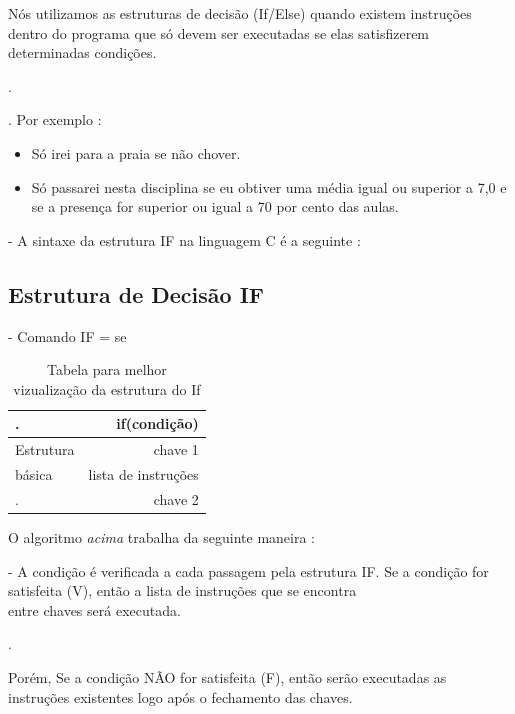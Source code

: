 \documentclass[a4paper,10pt]{article}  %
\begin{document}
    Nós utilizamos as estruturas de decisão (If/Else) quando existem instruções
dentro do programa que só devem ser executadas se elas satisfizerem  
determinadas condições.


  .

  . Por exemplo :

\begin{itemize}
               
       \item  Só irei para a praia se não chover. 
       \item  Só passarei nesta disciplina se eu obtiver uma média igual ou superior a 7,0 e se a presença for superior ou igual a 70 por cento das aulas.
             
\end{itemize}

   - A sintaxe da estrutura IF na linguagem C é a seguinte :
 
 \subsection{Estrutura de Decisão IF}   
       
  -  Comando IF = se
   
\begin{table}[H]
\begin{center}
 \caption{Tabela para melhor vizualização da estrutura do If}
\begin{tabular}{|l|r|}
  \hline \hline
  
  .          & if(condição) \\ \hline
  Estrutura  & chave 1  \\ \hline
    básica   &   lista de instruções  \\ \hline
  .          & chave 2  \\ \hline
  
\end{tabular}
\label{tab:resultados}
\end{center}
\end{table}


  O algoritmo \textit{acima} trabalha da seguinte maneira :
 

  -  A condição é verificada a cada passagem pela estrutura IF. Se a condição for satisfeita (V), então a lista de instruções que se encontra\\ entre chaves será executada.

 .

   Porém, Se a condição NÃO for satisfeita (F), então serão executadas as instruções existentes logo após o fechamento das chaves.
 
\end{document}
